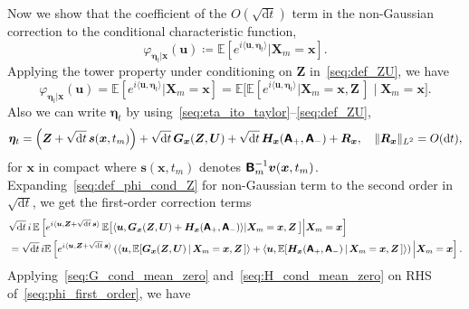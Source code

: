 Now we show that the coefficient of the $O(\sqrt{\mathrm{d}t})$ term in the non-Gaussian correction to the conditional characteristic function, 
\begin{equation*}
    \varphi_{\bm\eta_t|\bm{x}}(\bm{u})\coloneq\mathbb{E}[e^{i\langle\bm{u},\bm\eta_t\rangle}|\bm{X}_m=\bm{x}].
\end{equation*}
Applying the tower property under conditioning on $\bm{Z}$ in~\eqref{seq:def_ZU}, we have
\begin{equation}
    \varphi_{\bm\eta_t|\bm{x}}(\bm{u})
    =\mathbb{E}[e^{i\langle\bm{u},\bm\eta_t\rangle}|\bm{X}_m=\bm{x}]
    =\mathbb{E}\big[
    \mathbb{E}[e^{i\langle\bm{u},\bm\eta_t\rangle}|\bm{X}_m=\bm{x},\bm{Z}\,]
    \mid\bm{X}_m=\bm{x}\big].
    \label{seq:def_phi_cond_Z}
\end{equation}
Also we can write $\bm\eta_t$ by using~\eqref{seq:eta_ito_taylor}--\eqref{seq:def_ZU},
\begin{equation*}
    \bm\eta_t=\left(\bm{Z}+\sqrt{\mathrm{d}t}\,\bm{s}(\bm{x},t_m)\right)
    +\sqrt{\mathrm{d}t}\,\bm{G}_{\bm{x}}(\bm{Z},\bm{U})
    +\sqrt{\mathrm{d}t}\,\bm{H}_{\bm{x}}(\boldsymbol{\mathsf{A}}_+,\boldsymbol{\mathsf{A}}_-)
    +\bm{R}_{\bm{x}}
    ,
    \quad
    \|\bm{R}_{\bm{x}}\|_{L^2}=O(\mathrm{d}t),
\end{equation*}
for $\bm x$ in compact where $\bm{s}(\bm x,t_m)$ denotes $\boldsymbol{\mathsf{B}}_m^{-1}\bm v(\bm x, t_m)$.
Expanding~\eqref{seq:def_phi_cond_Z} for non-Gaussian term to the second order in $\sqrt{\mathrm{d}t}$, we get the first-order correction terms
\begin{equation}
    \begin{aligned}
    &\sqrt{\mathrm{d}t}\,i\,\mathbb{E}\left[
    e^{i\langle \bm{u},\bm{Z}+\sqrt{\mathrm{d}t}\,\bm{s} \rangle}\,
    \mathbb{E}\big[
    \langle\bm{u},\bm{G}_{\bm{x}}(\bm{Z},\bm{U})
    +\bm{H}_{\bm{x}}(\boldsymbol{\mathsf{A}}_+,\boldsymbol{\mathsf{A}}_-)
    \rangle
    \vert\bm{X}_m=\bm{x},\bm{Z}\,\big]\middle|\bm{X}_m=\bm{x}
    \right]
    \\
    &=\sqrt{\mathrm{d}t}\,i\mathbb{E}\left[e^{i\langle \bm{u},\bm{Z}+\sqrt{\mathrm{d}t}\,\bm{s}\rangle}
    \left(\langle \bm{u},\mathbb{E}[\bm{G}_{\bm{x}}(\bm{Z},\bm{U})\,|\,\bm{X}_m=\bm{x},\bm{Z}\,]\rangle
    +\langle \bm{u},\mathbb{E}[\bm{H}_{\bm{x}}(\boldsymbol{\mathsf{A}}_+,\boldsymbol{\mathsf{A}}_-)\,|\,\bm{X}_m=\bm{x},\bm{Z}\,]\rangle
    \right)\,\middle|\bm{X}_m=\bm{x}\right].
    \end{aligned}
    \label{seq:phi_first_order}
\end{equation}
Applying~\eqref{seq:G_cond_mean_zero} and~\eqref{seq:H_cond_mean_zero} on RHS of~\eqref{seq:phi_first_order}, we have
